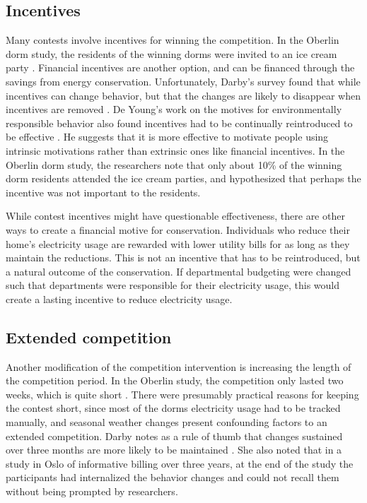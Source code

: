 \documentclass[11pt]{article}
\begin{document}
\subsection{Incentives}
\label{sec:incentives}

Many contests involve incentives for winning the competition. In the Oberlin dorm study, the residents of the winning dorms were invited to an ice cream party \cite{petersen-dorm-energy-reduction}. Financial incentives are another option, and can be financed through the savings from energy conservation. Unfortunately, Darby's survey found that while incentives can change behavior, but that the changes are likely to disappear when incentives are removed \cite{darby-review-2006}. De Young's work on the motives for environmentally responsible behavior also found incentives had to be continually reintroduced to be effective \cite{Young:2000fv}. He suggests that it is more effective to motivate people using intrinsic motivations rather than extrinsic ones like financial incentives. In the Oberlin dorm study, the researchers note that only about 10\% of the winning dorm residents attended the ice cream parties, and hypothesized that perhaps the incentive was not important to the residents.

While contest incentives might have questionable effectiveness, there are other ways to create a financial motive for conservation. Individuals who reduce their home's electricity usage are rewarded with lower utility bills for as long as they maintain the reductions. This is not an incentive that has to be reintroduced, but a natural outcome of the conservation. If departmental budgeting were changed such that departments were responsible for their electricity usage, this would create a lasting incentive to reduce electricity usage.

\subsection{Extended competition}

Another modification of the competition intervention is increasing the length of the competition period. In the Oberlin study, the competition only lasted two weeks, which is quite short \cite{petersen-dorm-energy-reduction}. There were presumably practical reasons for keeping the contest short, since most of the dorms electricity usage had to be tracked manually, and seasonal weather changes present confounding factors to an extended competition. Darby notes as a rule of thumb that changes sustained over three months are more likely to be maintained \cite{darby-review-2006}. She also noted that in a study in Oslo of informative billing over three years, at the end of the study the participants had internalized the behavior changes and could not recall them without being prompted by researchers.
\end{document}

